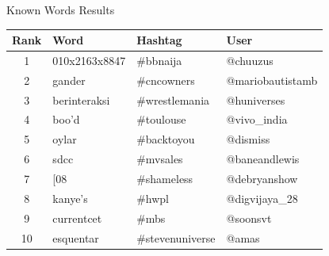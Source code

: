 \documentclass{beamer}
\begin{document}
\begin{frame}{Known Words Results}
    \begin{tabular}{clll}
        \toprule
        Rank & Word & Hashtag & User \\
        \midrule
        1 & 010x2163x8847 & \#bbnaija & @chuuzus \\
        2 & gander & \#cncowners & @mariobautistamb \\
        3 & berinteraksi & \#wrestlemania & @huniverses \\
        4 & boo'd & \#toulouse & @vivo\_india \\
        5 & oylar & \#backtoyou & @dismiss \\
        6 & sdcc & \#mvsales & @baneandlewis \\
        7 & [08 & \#shameless & @debryanshow \\
        8 & kanye's & \#hwpl & @digvijaya\_28 \\
        9 & currentcet & \#mbs & @soonsvt \\
        10 & esquentar & \#stevenuniverse & @amas\\
        \bottomrule
    \end{tabular}
\end{frame}
\end{document}
